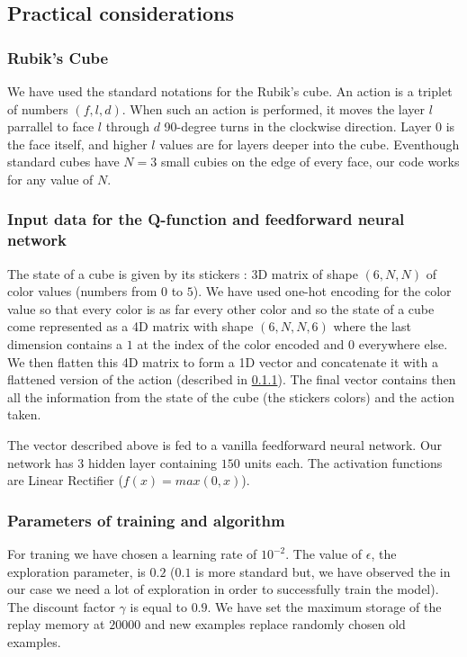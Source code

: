 \documentclass{article} %
\begin{document}
\subsection{Practical considerations}

\subsubsection{Rubik's Cube}
\label{action}
We have used the standard notations for the Rubik's cube. An action is a triplet of numbers $(f, l, d)$. When such an action is performed, it moves the layer $l$ parrallel to face $l$ through $d$ 90-degree turns in the clockwise direction. Layer $0$ is the face itself, and higher $l$ values are for layers deeper into the cube. Eventhough standard cubes have $N=3$ small cubies on the edge of every face, our code works for any value of $N$.

\subsubsection{Input data for the Q-function and feedforward neural network}
The state of a cube is given by its stickers : 3D matrix of shape $(6, N, N)$ of color values (numbers from $0$ to $5$). We have used one-hot encoding for the color value so that every color is as far every other color and so the state of a cube come represented as a 4D matrix with shape $(6, N, N, 6)$ where the last dimension contains a $1$ at the index of the color encoded and $0$ everywhere else. We then flatten this 4D matrix to form a 1D vector and concatenate it with a flattened version of the action (described in \ref{action}). The final vector contains then all the information from the state of the cube (the stickers colors) and the action taken.

The vector described above is fed to a vanilla feedforward neural network. Our network has $3$ hidden layer containing $150$ units each. The activation functions are Linear Rectifier ($f(x) = max(0, x)$).

\subsubsection{Parameters of training and algorithm}
For traning we have chosen a learning rate of $10^{-2}$. The value of $\epsilon$, the exploration parameter, is $0.2$ ($0.1$ is more standard but, we have observed the in our case we need a lot of exploration in order to successfully train the model). The discount factor $\gamma$ is equal to $0.9$. We have set the maximum storage of the replay memory at $20000$ and new examples replace randomly chosen old examples.
\end{document}

